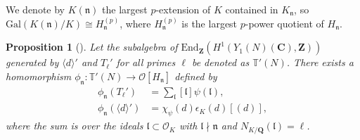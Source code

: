 \documentclass[10pt,letterpaper]{amsart}
\theoremstyle{plain}
\theoremstyle{definition}
\theoremstyle{definition}
\theoremstyle{plain}
\newtheorem{prop}[thm]{Proposition}
\theoremstyle{plain}
\theoremstyle{plain}
\theoremstyle{remark}
\numberwithin{equation}{section}
\newcommand{\fkl}{\mathfrak{l}}
\newcommand{\fkn}{\mathfrak{n}}
\newcommand{\bC}{\mathbf{C}}
\def\cO{\mathcal O}
\newcommand{\Q}{\mathbf{Q}}
\newcommand{\Z}{\mathbf{Z}}
\begin{document}
We denote by $K(\fkn)$ the largest $p$-extension of $K$ contained in $K_\fkn$, so ${\mathrm{Gal}}(K(\fkn)/K)\cong H_{\fkn}^{(p)}$, where $H_{\fkn}^{(p)}$ is the largest $p$-power quotient of $H_{\fkn}$. 

\begin{prop}[{\cite[Prop.~3.2.1]{LLZ-K}}]\label{phi_n}
Let the subalgebra of ${\mathrm{End}}_{\Z}(H^1(Y_1(N)(\bC),\Z))$ generated by $\langle d\rangle'$ and $T_\ell'$ for all primes $\ell$ be denoted as $\mathbb{T}'(N)$. There exists a homomorphism $\phi_{\fkn}: \mathbb{T}'(N)\rightarrow \mathcal{O}[H_{\fkn}]$ %
defined by %
    \begin{align*}
        \phi_{\fkn}(T_\ell')&=\sum_{\fkl}[\fkl]\psi(\fkl),\\
        \phi_{\fkn}(\langle d\rangle ')&=\chi_\psi(d)\epsilon_{K}(d)[(d)],
    \end{align*}
where the sum is over the ideals $\mathfrak{l}\subset\cO_K$ with $\fkl\nmid\mathfrak{n}$ and $N_{K/\Q}(\fkl)=\ell$.
\end{prop}

\end{document}
